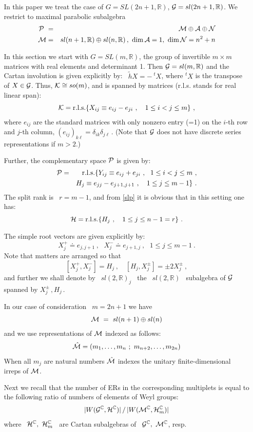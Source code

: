 \documentclass[a4paper]{jpconf}
\def\beq{\begin{equation}}
\def\eqn#1{\beq\label{#1}}
\def\ee{\end{equation}}
\def\bb {\begin {eqnarray}}
\def\eqnn#1{\bb\label{#1}}
\def\eea {\end {eqnarray}}
\def\th{{\tilde h}}
\def\bac{\mathbb{C}}%
\def\bbr{\mathbb{R}}%
\def\d{\delta}
\def\vr{\vert}
\def\ca{{\cal A}} \def\cb{{\cal B}} \def\cc{{\cal C}}
\def\cg{{\cal G}} \def\ch{{\cal H}} \def\ci{{\cal I}}
\def\cm{{\cal M}} \def\cn{{\cal N}} \def\co{{\cal O}}
\def\cp{{\cal P}} \def\cq{{\cal Q}} \def\car{{\cal R}}
\begin{document}
In this paper we treat the case of $G=SL(2n+1,\bbr)$, $\cg=sl(2n+1,\bbr)$. We restrict to maximal parabolic subalgebra
\eqnn{parab} \cp ~&=&~ \cm \oplus \ca \oplus \cn \\
\cm &=& sl(n+1,\bbr) \oplus sl(n,\bbr) \,, ~\dim \ca = 1, ~\dim \cn = n^2 +n\eea


 In this section we start with $G=SL(m,\bbr)$, the group of invertible $m \times m $ matrices with real elements and
determinant 1. Then $\cg = sl(m,\bbr)$ and the Cartan involution is given explicitly by:
~$\th X = -\ ^tX$, where $^tX$ is the transpose of $X\in\cg$. Thus, ${\cal K} \cong so(m)$, and is spanned by matrices
(r.l.s. stands for real linear span):
\eqn{maxc}  \ck = {\rm r.l.s.} \{ X_{ij} \equiv e_{ij} - e_{ji} \ , \quad 1\leq i < j \leq m \} \ ,\ee
where $e_{ij}$ are the standard matrices with only nonzero entry (=1) on the $i$-th row and $j$-th column,
$(e_{ij})_{k\ell} = \d_{ik}\d_{j\ell}\,$. (Note that $\cg$ does not have discrete series representations
if $m>2$.)

Further, the complementary space $\cp$ is given by:
\eqnn{slp} \cp &=& {\rm r.l.s.} \{ Y_{ij} \equiv e_{ij} + e_{ji} \ , ~~ 1\leq i < j \leq m \ ,\\
&&  H_j \equiv e_{jj} - e_{j+1,j+1} \ , \quad 1\leq j \leq m-1 \}\ .\eea
The split rank is ~$r = m-1$, and from \eqref{slp} it is obvious that in this setting one has:
\eqn{aaa}\ch = {\rm r.l.s.} \{ H_j   \ , \quad 1\leq j \leq n-1=r \}\ .\ee

The simple root vectors are given explicitly by:
\eqn{simple} X^+_j \doteq e_{j,j+1} \ , ~~~ X^-_j \doteq e_{j+1,j} \ , ~~~ 1\leq j \leq m-1 \ .\ee
Note that matters are arranged so that
\eqn{slsub} [X^+_j,X^-_j] = H_j\ , \quad [H_j,X^\pm_j] = \pm 2X^\pm_j\ ,\ee
and further we shall denote by ~$sl(2,\bbr)_j$~ the ~$sl(2,\bbr)$~
subalgebra of $\cg$ spanned  by $X^\pm_j\,, H_j\,$.


In our case of consideration ~$m=2n+1$ we have
\eqn{facm}  \cm ~=~ sl(n+1) \oplus sl(n) \ee
and we use representations of $\cm$ indexed as follows:
\eqn{repm} \hat{\cm} = (m_1,\ldots,m_{n} \ ;\ m_{n+2}, \ldots, m_{2n}) \ee
When all $m_j$ are natural numbers   $\hat{\cm}$ indexes the unitary finite-dimensional irreps of $\cm$.












Next we recall that the number of ERs in the corresponding multiplets is equal
 to the following ratio of numbers of elements of Weyl groups:
\eqn{multi} \vr W(\cg^\bac,\ch^\bac)\vr\, /\, \vr
W(\cm^\bac,\ch_m^\bac)\vr   \ee
where ~$\ch^\bac,\ \ch^\bac_m$~ are Cartan subalgebras of ~$\cg^\bac,\ \cm^\bac$, resp.
\end{document}
